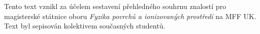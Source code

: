 Tento text vznikl za účelem sestavení přehledného souhrnu znalostí pro magisterské státnice oboru \textit{Fyzika povrchů a ionizovaných prostředí} na MFF UK. Text byl sepisován kolektivem současných studentů.